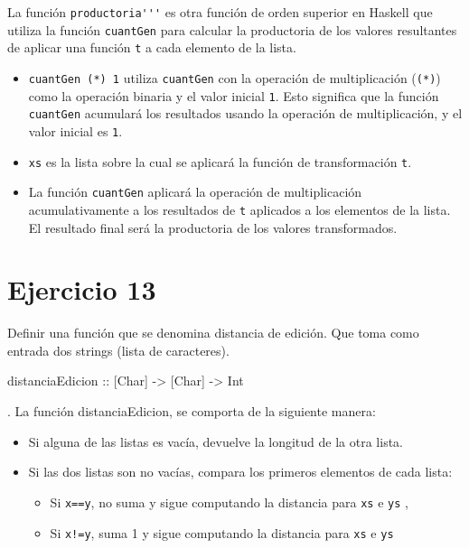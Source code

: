 \documentclass{article}
\begin{document}
    La función \verb|productoria'''| es otra función de orden superior en Haskell que utiliza la función \verb|cuantGen| para calcular la productoria de los valores resultantes de aplicar una función \verb|t| a cada elemento de la lista.
    \begin{itemize}
    \item 
    \verb|cuantGen (*) 1| utiliza \verb|cuantGen| con la operación de multiplicación (\verb|(*)|) como la operación binaria y el valor inicial \verb|1|. Esto significa que la función \verb|cuantGen| acumulará los resultados usando la operación de multiplicación, y el valor inicial es \verb|1|.
    \item 
    \verb|xs| es la lista sobre la cual se aplicará la función de transformación \verb|t|.
    \item 
    La función \verb|cuantGen| aplicará la operación de multiplicación acumulativamente a los resultados de \verb|t| aplicados a los elementos de la lista. El resultado final será la productoria de los valores transformados.
\end{itemize}
        
\section*{Ejercicio 13}
Definir una función que se denomina distancia de edición. Que toma como entrada dos strings (lista de caracteres). 
\begin{haskell}
distanciaEdicion :: [Char] -> [Char] -> Int
\end{haskell}. 
La función distanciaEdicion, se comporta de la siguiente manera:
\begin{itemize}
\item 
Si alguna de las listas es vacía, devuelve la longitud de la otra lista.
\item 
Si las dos listas son no vacías, compara los primeros elementos de cada lista:
\begin{itemize}
\item 
Si \verb|x==y|, no suma y sigue computando la distancia para \verb|xs| e \verb|ys| ,
\item 
Si \verb|x!=y|, suma 1 y sigue computando la distancia para \verb|xs| e \verb|ys|
\end{itemize}
\end{itemize}
\end{document}
